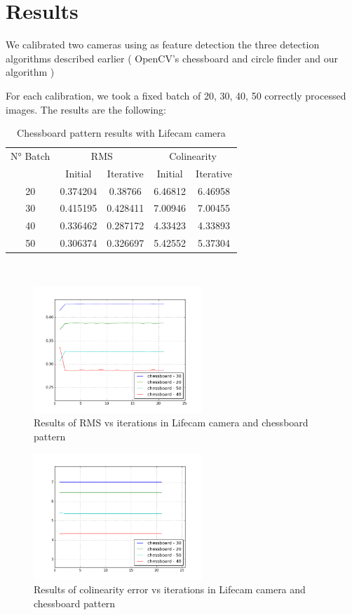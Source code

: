 \documentclass[journal]{IEEEtran}
\begin{document}
\section{Results}
We calibrated two cameras using as feature detection the three detection algorithms described earlier ( OpenCV's chessboard and circle finder and our algorithm )

For each calibration, we took a fixed batch of 20, 30, 40, 50 correctly processed images. The results are the following:

\begin{table}[h]
\centering
\caption{Chessboard pattern results with Lifecam camera}
\begin{tabular}{ |c||c|c|c|c|  }
 \hline
 N° Batch & \multicolumn{2}{c|}{RMS} & \multicolumn{2}{c|}{Colinearity}\\
 \cline{2-5}
 & Initial & Iterative & Initial & Iterative \\
 \hline
 20        & 0.374204 & 0.38766 & 6.46812 & 6.46958 \\
 30        & 0.415195 & 0.428411 & 7.00946 & 7.00455 \\
 40        & 0.336462 & 0.287172 & 4.33423 & 4.33893 \\
 50        & 0.306374 & 0.326697 & 5.42552 & 5.37304 \\
 \hline
\end{tabular}
\\
\end{table}

\begin{figure}[H]
\centering
\includegraphics[width=2.5in]{_img/report_4/img_results_lifecam_chessboard.png}
\caption{Results of RMS vs iterations in Lifecam camera and chessboard pattern}
\end{figure}

\begin{figure}[H]
\centering
\includegraphics[width=2.5in]{_img/report_4/img_results_lifecam_colinearity_chessboard.png}
\caption{Results of colinearity error vs iterations in Lifecam camera and chessboard pattern}
\end{figure}
\end{document}
